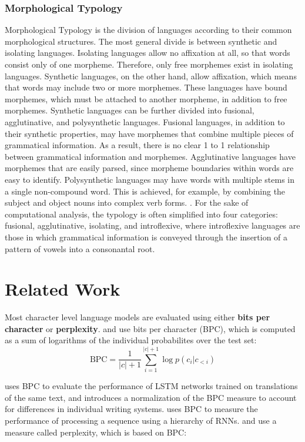 \documentclass[11pt,a4paper,twoside,openright]{scrbook}
\begin{document}
\subsection{Morphological Typology}
Morphological Typology is the division of languages according to their common morphological structures. The most general divide is between synthetic and isolating languages. Isolating languages allow no affixation at all, so that words consist only of one morpheme. Therefore, only free morphemes exist in isolating languages. Synthetic languages, on the other hand, allow affixation, which means that words may include two or more morphemes. These languages have bound morphemes, which must be attached to another morpheme, in addition to free morphemes. Synthetic languages can be further divided into fusional, agglutinative, and polysynthetic languages. Fusional languages, in addition to their synthetic properties, may have morphemes that combine multiple pieces of grammatical information. As a result, there is no clear 1 to 1 relationship between grammatical information and morphemes. Agglutinative languages have morphemes that are easily parsed, since morpheme boundaries within words are easy to identify. Polysynthetic languages may have words with multiple stems in a single non-compound word. This is achieved, for example, by combining the subject and object nouns into complex verb forms.
\cite{linguistic-typology} \cite{haspelmath}.
For the sake of computational analysis, the typology is often simplified into four categories: fusional, agglutinative, isolating, and introflexive, where introflexive languages are those in which grammatical information is conveyed through the insertion of a pattern of vowels into a consonantal root. 

\chapter{Related Work}
Most character level language models are evaluated using either \textbf{bits per character} or \textbf{perplexity}. \cite{cotterell} and \cite{hermans} use bits per character (BPC), which is computed as a sum of logarithms of the individual probabilites over the test set:
\begin{equation}
\text{BPC} = \frac{1}{|c| + 1} \sum_{i=1}^{|c| + 1} \log p(c_i | c_{<i})
\label{bitspercharacter}
\end{equation}

\cite{cotterell} uses BPC to evaluate the performance of LSTM networks trained on translations of the same text, and introduces a normalization of the BPC measure to account for differences in individual writing systems. \cite{hermans} uses BPC to measure the performance of processing a sequence using a hierarchy of RNNs.
\cite{mikolov} and \cite{hwang} use a measure called perplexity, which is based on BPC:
\end{document}

